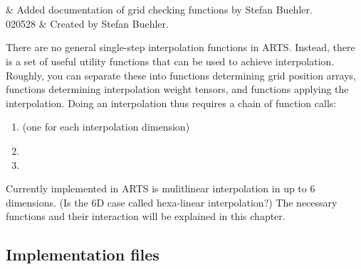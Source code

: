 \graphicspath{{Figs/interpolation/}}
%
%
\chapter{}
\label{sec:interpolation}


%
%
 & Added documentation of grid checking functions by Stefan Buehler.\\
  020528 & Created by Stefan Buehler.\\
\stophistory




%
%

There are no general single-step interpolation functions in ARTS.
Instead, there is a set of useful utility functions that can be used
to achieve interpolation. Roughly, you can separate these into
functions determining grid position arrays, functions determining
interpolation weight tensors, and functions applying the
interpolation. Doing an interpolation thus requires a chain of
function calls:
\begin{enumerate}
\item {} (one for each interpolation dimension)
\item {}
\item {}
\end{enumerate}
Currently implemented in ARTS is mulitlinear interpolation in up to 6
dimensions. (Is the 6D case called hexa-linear interpolation?)  The
necessary functions and their interaction will be explained in this
chapter.

\section{Implementation files}

